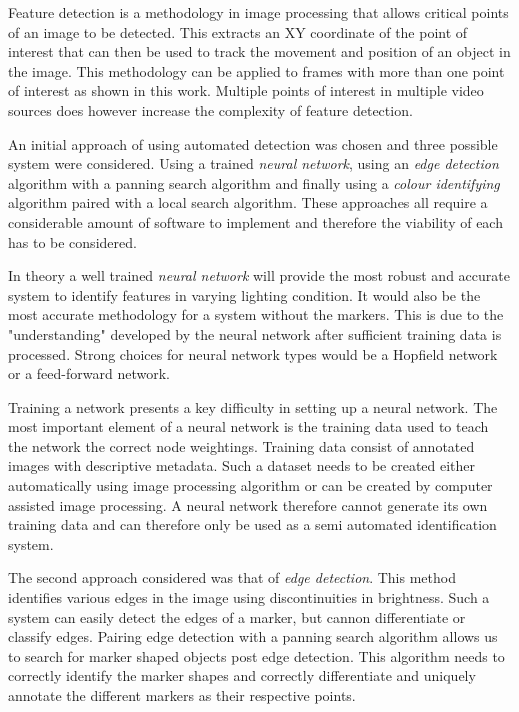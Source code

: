 Feature detection is a methodology in image processing that allows critical points of an image to be detected. This extracts an XY coordinate of the point of interest that can then be used to track the movement and position of an object in the image. This methodology can be applied to frames with more than one point of interest as shown in this work. Multiple points of interest in multiple video sources does however increase the complexity of feature detection.

An initial approach of using automated detection was chosen and three possible system were considered. Using a trained \textit{neural network}, using an \textit{edge detection} algorithm with a panning search algorithm and finally using a \textit{colour identifying} algorithm paired with a local search algorithm. These approaches all require a considerable amount of software to implement and therefore the viability of each has to be considered.

In theory a well trained \textit{neural network} will provide the most robust and accurate system to identify features in varying lighting condition. It would also be the most accurate methodology for a system without the markers. This is due to the "understanding" developed by the neural network after sufficient training data is processed. Strong choices for neural network types would be a Hopfield network or a feed-forward network.

Training a network presents a key difficulty in setting up a neural network. The most important element of a neural network is the training data used to teach the network the correct node weightings. Training data consist of annotated images with descriptive metadata. Such a dataset needs to be created either automatically using image processing algorithm or can be created by computer assisted image processing. A neural network therefore cannot generate its own training data and can therefore only be used as a semi automated identification system.

The second approach considered was that of \textit{edge detection}. This method identifies various edges in the image using discontinuities in brightness. Such a system can easily detect the edges of a marker, but cannon differentiate or classify edges. Pairing edge detection with a panning search algorithm allows us to search for marker shaped objects post edge detection. This algorithm needs to correctly identify the marker shapes and correctly differentiate and uniquely annotate the different markers as their respective points.

